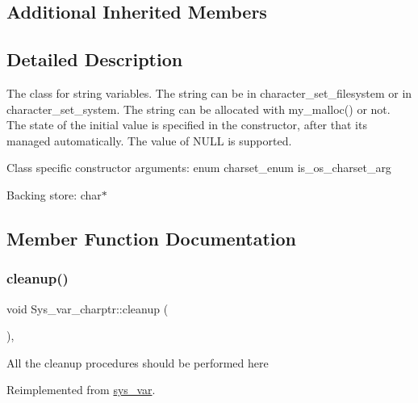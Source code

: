 \subsection*{Additional Inherited Members}


\subsection{Detailed Description}
The class for string variables. The string can be in character\+\_\+set\+\_\+filesystem or in character\+\_\+set\+\_\+system. The string can be allocated with my\+\_\+malloc() or not. The state of the initial value is specified in the constructor, after that it\textquotesingle{}s managed automatically. The value of N\+U\+LL is supported.

Class specific constructor arguments\+: enum charset\+\_\+enum is\+\_\+os\+\_\+charset\+\_\+arg

Backing store\+: char$\ast$ 

\subsection{Member Function Documentation}
\mbox{\label{classSys__var__charptr_a7cb7fcaf1b60752b38bfcff61e92b2ca}} 
\subsubsection{\texorpdfstring{cleanup()}{cleanup()}}
{\footnotesize\ttfamily void Sys\+\_\+var\+\_\+charptr\+::cleanup (\begin{DoxyParamCaption}{ }\end{DoxyParamCaption})\hspace{0.3cm}{\ttfamily [inline]}, {\ttfamily [virtual]}}

All the cleanup procedures should be performed here 

Reimplemented from \mbox{\hyperlink{classsys__var_a5b6d43884f67de0f40f441d9cf724589}{sys\+\_\+var}}.

\mbox{\label{classSys__var__charptr_a9f0eb7d9ac367d2652c5aefe05282dae}} 

